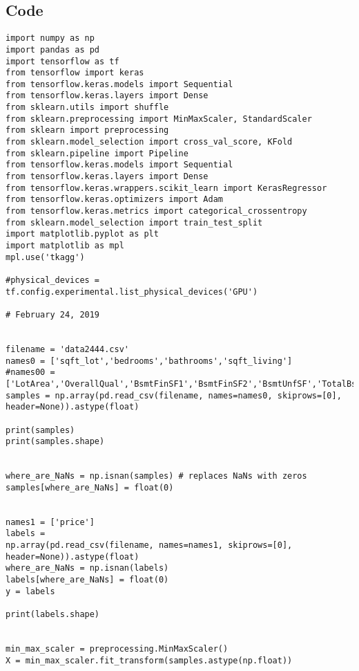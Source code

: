 \documentclass[12pt,a4paper]{article}
\begin{document}
\begin{appendices}

\section{Code}
\begin{verbatim}import numpy as np 
import pandas as pd
import tensorflow as tf 
from tensorflow import keras
from tensorflow.keras.models import Sequential 
from tensorflow.keras.layers import Dense 
from sklearn.utils import shuffle
from sklearn.preprocessing import MinMaxScaler, StandardScaler
from sklearn import preprocessing
from sklearn.model_selection import cross_val_score, KFold
from sklearn.pipeline import Pipeline
from tensorflow.keras.models import Sequential
from tensorflow.keras.layers import Dense
from tensorflow.keras.wrappers.scikit_learn import KerasRegressor
from tensorflow.keras.optimizers import Adam
from tensorflow.keras.metrics import categorical_crossentropy
from sklearn.model_selection import train_test_split
import matplotlib.pyplot as plt
import matplotlib as mpl
mpl.use('tkagg')

#physical_devices = tf.config.experimental.list_physical_devices('GPU')

# February 24, 2019


filename = 'data2444.csv'
names0 = ['sqft_lot','bedrooms','bathrooms','sqft_living']
#names00 = ['LotArea','OverallQual','BsmtFinSF1','BsmtFinSF2','BsmtUnfSF','TotalBsmtSF','1stFlrSF','2ndFlrSF','LowQualFinSF','GrLivArea','BsmtFullBath','BsmtHalfBath','FullBath','HalfBath','BedroomAbvGr','KitchenAbvGr','TotRmsAbvGrd','GarageCars','GarageArea','WoodDeckSF','OpenPorchSF','EnclosedPorch','3SsnPorch','ScreenPorch','PoolArea','MiscVal','MoSold','YrSold']
samples = np.array(pd.read_csv(filename, names=names0, skiprows=[0], header=None)).astype(float)

print(samples)
print(samples.shape)


where_are_NaNs = np.isnan(samples) # replaces NaNs with zeros 
samples[where_are_NaNs] = float(0)


names1 = ['price']
labels =
np.array(pd.read_csv(filename, names=names1, skiprows=[0], header=None)).astype(float)
where_are_NaNs = np.isnan(labels)
labels[where_are_NaNs] = float(0)
y = labels

print(labels.shape)


min_max_scaler = preprocessing.MinMaxScaler()
X = min_max_scaler.fit_transform(samples.astype(np.float))


\end{verbatim}
\end{appendices}
\end{document}
